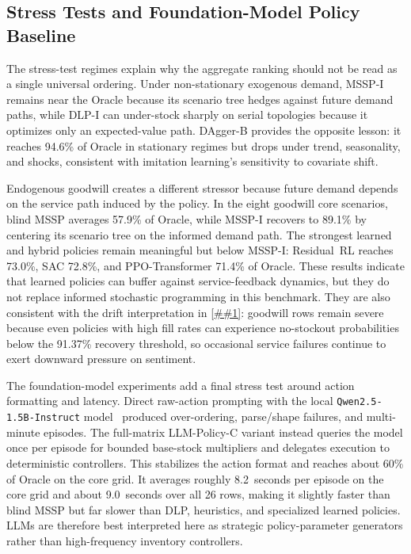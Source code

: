 \documentclass[10pt,a4paper]{article}
\providecommand{\Cref}[1]{\ref{##1}}
\begin{document}
\subsection{Stress Tests and Foundation-Model Policy Baseline}

The stress-test regimes explain why the aggregate ranking should not be
read as a single universal ordering. Under non-stationary exogenous
demand, MSSP-I remains near the Oracle because its scenario tree hedges
against future demand paths, while DLP-I can under-stock sharply on
serial topologies because it optimizes only an expected-value path.
DAgger-B provides the opposite lesson: it reaches 94.6\% of Oracle in
stationary regimes but drops under trend, seasonality, and shocks,
consistent with imitation learning's sensitivity to covariate shift.

Endogenous goodwill creates a different stressor because future demand
depends on the service path induced by the policy. In the eight goodwill
core scenarios, blind MSSP averages 57.9\% of Oracle, while MSSP-I
recovers to 89.1\% by centering its scenario tree on the informed demand
path. The strongest learned and hybrid policies remain meaningful but
below MSSP-I: Residual~RL reaches 73.0\%, SAC 72.8\%, and
PPO-Transformer 71.4\% of Oracle. These results indicate that learned
policies can buffer against service-feedback dynamics, but they do not
replace informed stochastic programming in this benchmark.
They are also consistent with the drift interpretation in
\Cref{prop:goodwill}: goodwill rows remain severe because even policies
with high fill rates can experience no-stockout probabilities below the
91.37\% recovery threshold, so occasional service failures continue to
exert downward pressure on sentiment.

The foundation-model experiments add a final stress test around action
formatting and latency. Direct raw-action prompting with the local
\texttt{Qwen2.5-1.5B-Instruct} model~\citep{qwen2024} produced over-ordering,
parse/shape failures, and multi-minute episodes. The full-matrix
LLM-Policy-C variant instead queries the model once per episode for
bounded base-stock multipliers and delegates execution to deterministic
controllers. This stabilizes the action format and reaches about 60\%
of Oracle on the core grid. It averages roughly 8.2~seconds per episode
on the core grid and about 9.0~seconds over all 26 rows, making it
slightly faster than blind MSSP but far slower than DLP, heuristics, and
specialized learned policies. LLMs are
therefore best interpreted here as strategic policy-parameter generators
rather than high-frequency inventory controllers.
\end{document}
